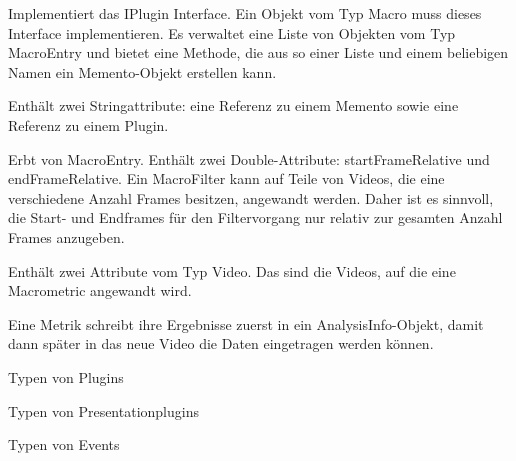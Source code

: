 Implementiert das IPlugin Interface. Ein Objekt vom Typ Macro muss dieses Interface implementieren. Es verwaltet eine Liste von Objekten vom Typ MacroEntry und bietet eine Methode, die aus so einer Liste und einem beliebigen Namen ein Memento-Objekt erstellen kann.


Enthält zwei Stringattribute: eine Referenz zu einem Memento sowie eine Referenz zu einem Plugin.


Erbt von MacroEntry. Enthält zwei Double-Attribute: startFrameRelative und endFrameRelative. Ein MacroFilter kann auf Teile von Videos, die eine verschiedene Anzahl Frames besitzen, angewandt werden. Daher ist es sinnvoll, die Start- und Endframes für den Filtervorgang nur relativ zur gesamten Anzahl Frames anzugeben.


Enthält zwei Attribute vom Typ Video. Das sind die Videos, auf die eine Macrometric angewandt wird.

Eine Metrik schreibt ihre Ergebnisse zuerst in ein AnalysisInfo-Objekt, damit dann später in das neue Video die Daten eingetragen werden können.


Typen von Plugins


Typen von Presentationplugins


Typen von Events